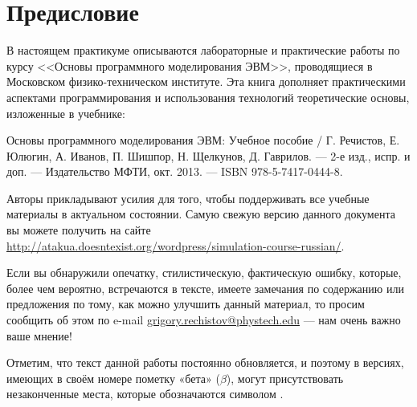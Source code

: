 \chapter*{Предисловие}\label{chap:contrib}

В настоящем практикуме описываются лабораторные и практические работы по курсу <<Основы программного моделирования ЭВМ>>, проводящиеся в Московском физико-техническом институте. Эта книга дополняет практическими аспектами программирования и использования технологий теоретические основы, изложенные в учебнике: 

Основы программного моделирования ЭВМ: Учебное пособие / Г. Речистов, Е. Юлюгин, А. Иванов, П. Шишпор, Н. Щелкунов, Д. Гаврилов. — 2-е изд., испр. и доп. — Издательство МФТИ, окт. 2013. — ISBN 978-5-7417-0444-8.

Авторы прикладывают усилия для того, чтобы поддерживать все учебные материалы в актуальном состоянии. Самую свежую версию данного документа вы можете получить на сайте \url{http://atakua.doesntexist.org/wordpress/simulation-course-russian/}.

Если вы обнаружили опечатку, стилистическую, фактическую ошибку, которые, более чем вероятно, встречаются в тексте, имеете замечания по содержанию или предложения по тому, как можно улучшить данный материал, то просим сообщить об этом по e-mail \url{grigory.rechistov@phystech.edu} --- нам очень важно ваше мнение!

Отметим, что текст данной работы постоянно обновляется, и поэтому в версиях, имеющих в своём номере пометку «бета» ($\beta$), могут присутствовать незаконченные места, которые обозначаются символом \todo.

